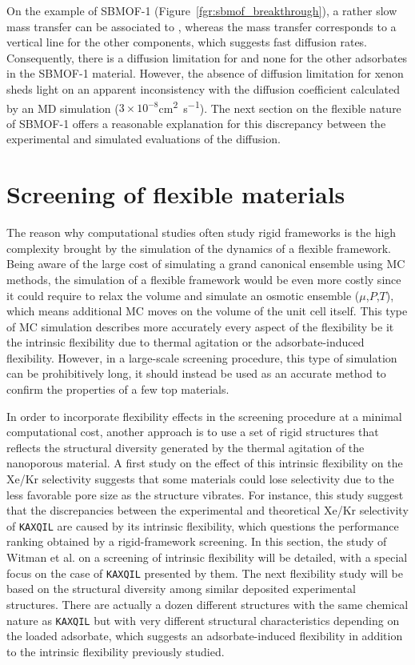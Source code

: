 \documentclass[main]{subfiles}
\begin{document}
On the example of SBMOF-1 (Figure~\ref{fgr:sbmof_breakthrough}), a rather slow mass transfer can be associated to , whereas the mass transfer corresponds to a vertical line for the other components, which suggests fast diffusion rates. Consequently, there is a diffusion limitation for  and none for the other adsorbates in the SBMOF-1 material. However, the absence of diffusion limitation for xenon sheds light on an apparent inconsistency with the diffusion coefficient calculated by an MD simulation ($3\times 10^{-8}$\si{\square\cm\per\s}). The next section on the flexible nature of SBMOF-1 offers a reasonable explanation for this discrepancy between the experimental and simulated evaluations of the diffusion.

\section{Screening of flexible materials}

The reason why computational studies often study rigid frameworks is the high complexity brought by the simulation of the dynamics of a flexible framework. Being aware of the large cost of simulating a grand canonical ensemble using MC methods, the simulation of a flexible framework would be even more costly since it could require to relax the volume and simulate an osmotic ensemble ($\mu$,$P$,$T$), which means additional MC moves on the volume of the unit cell itself.\autocite{Bousquet2012} This type of MC simulation describes more accurately every aspect of the flexibility be it the intrinsic flexibility due to thermal agitation or the adsorbate-induced flexibility. However, in a large-scale screening procedure, this type of simulation can be prohibitively long, it should instead be used as an accurate method to confirm the properties of a few top materials. 

In order to incorporate flexibility effects in the screening procedure at a minimal computational cost, another approach is to use a set of rigid structures that reflects the structural diversity generated by the thermal agitation of the nanoporous material. A first study on the effect of this intrinsic flexibility on the Xe/Kr selectivity suggests that some materials could lose selectivity due to the less favorable pore size as the structure vibrates.\autocite{Witman_2017} For instance, this study suggest that the discrepancies between the experimental and theoretical Xe/Kr selectivity of \texttt{KAXQIL}\autocite{KAXQIL} are caused by its intrinsic flexibility, which questions the performance ranking obtained by a rigid-framework screening. In this section, the study of Witman et al.\autocite{Witman_2017} on a screening of intrinsic flexibility will be detailed, with a special focus on the case of \texttt{KAXQIL} presented by them. The next flexibility study will be based on the structural diversity among similar deposited experimental structures. There are actually a dozen different structures with the same chemical nature as \texttt{KAXQIL} but with very different structural characteristics depending on the loaded adsorbate, which suggests an adsorbate-induced flexibility in addition to the intrinsic flexibility previously studied. 
\end{document}
